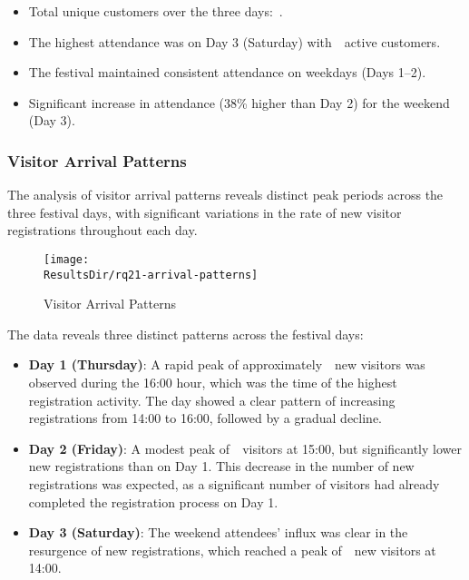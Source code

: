 \begin{keytakeaways}
	\begin{itemize}
		\item Total unique customers over the three days:~.
		\item The highest attendance was on Day 3 (Saturday) with~~active customers.
		\item The festival maintained consistent attendance on weekdays (Days 1–2).
		\item Significant increase in attendance (38\% higher than Day 2) for the weekend (Day 3).
	\end{itemize}
\end{keytakeaways}


\subsubsection{Visitor Arrival Patterns}
\label{subsubsec:analysis-visitor-patterns}

\begin{rqbox}
	\textit{}
\end{rqbox}

The analysis of visitor arrival patterns reveals distinct peak periods across the three festival days, with significant variations in the rate of new visitor registrations throughout each day.

\begin{figure}[H]
	\centering
	\texttt{[image: \\ResultsDir/rq21-arrival-patterns]}
	\caption{Visitor Arrival Patterns}
	\label{fig:visitor-arrival-patterns}
	\source
\end{figure}

The data reveals three distinct patterns across the festival days:

\begin{itemize}
	\item \textbf{Day 1 (Thursday)}: A rapid peak of approximately~~new visitors was observed during the 16:00 hour, which was the time of the highest registration activity.
	\subitem The day showed a clear pattern of increasing registrations from 14:00 to 16:00, followed by a gradual decline.
	\item \textbf{Day 2 (Friday)}: A modest peak of~~visitors at 15:00, but significantly lower new registrations than on Day 1.
	\subitem This decrease in the number of new registrations was expected, as a significant number of visitors had already completed the registration process on Day 1.
	\item \textbf{Day 3 (Saturday)}: The weekend attendees' influx was clear in the resurgence of new registrations, which reached a peak of~~new visitors at 14:00.
\end{itemize}

